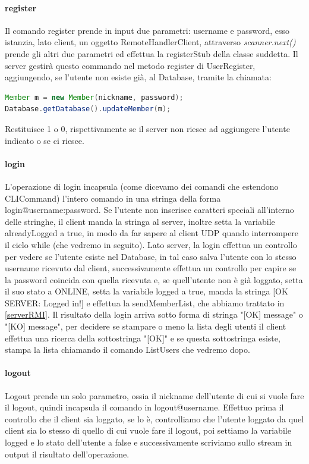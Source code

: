\documentclass[]{article}
\begin{document}
\paragraph{register}
Il comando register prende in input due parametri: username e password, esso istanzia, lato client, un oggetto RemoteHandlerClient, attraverso \textit{scanner.next()} prende gli altri due parametri ed effettua la registerStub della classe suddetta. Il server gestirà questo commando nel metodo register di UserRegister, aggiungendo, se l'utente non esiste già, al Database, tramite la chiamata:
\begin{lstlisting}[language=java]
Member m = new Member(nickname, password);
Database.getDatabase().updateMember(m);
\end{lstlisting}
Restituisce 1 o 0, rispettivamente se il server non riesce ad aggiungere l'utente indicato o se ci riesce.
\paragraph{login}
L'operazione di login incapsula (come dicevamo dei comandi che estendono CLICommand) l'intero comando in una stringa della forma\\ login@username:password. Se l'utente non inserisce caratteri speciali all'interno delle stringhe, il client manda la stringa al server, inoltre setta la variabile alreadyLogged a true, in modo da far sapere al client UDP quando interrompere il ciclo while (che vedremo in seguito).
Lato server, la login effettua un controllo per vedere se l'utente esiste nel Database, in tal caso salva l'utente con lo stesso username ricevuto dal client, successivamente effettua un controllo per capire se la password coincida con quella ricevuta e, se quell'utente non è già loggato, setta il suo stato a ONLINE, setta la variabile logged a true, manda la stringa [OK SERVER: Logged in!] e effettua la sendMemberList, che abbiamo trattato in \autoref{serverRMI}.
Il risultato della login arriva sotto forma di stringa "[OK] message" o "[KO] message", per decidere se stampare o meno la lista degli utenti il client effettua una ricerca della sottostringa "[OK]" e se questa sottostringa esiste, stampa la lista chiamando il comando ListUsers che vedremo dopo.
\paragraph{logout}
Logout prende un solo parametro, ossia il nickname dell'utente di cui si vuole fare il logout, quindi incapsula il comando in logout@username. Effettuo prima il controllo che il client sia loggato, se lo è, controlliamo che l'utente loggato da quel client sia lo stesso di quello di cui vuole fare il logout, poi settiamo la variabile logged e lo stato dell'utente a false e successivamente scriviamo sullo stream in output il risultato dell'operazione.
\end{document}

